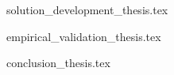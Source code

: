 \documentclass[11pt,a4paper]{report}
\begin{document}
{solution_development_thesis.tex}

{empirical_validation_thesis.tex}

{conclusion_thesis.tex}




\renewcommand{\bibname}{References}


\renewcommand{\bibname}{Systematic Literature Review References}

% 

\end{document}
